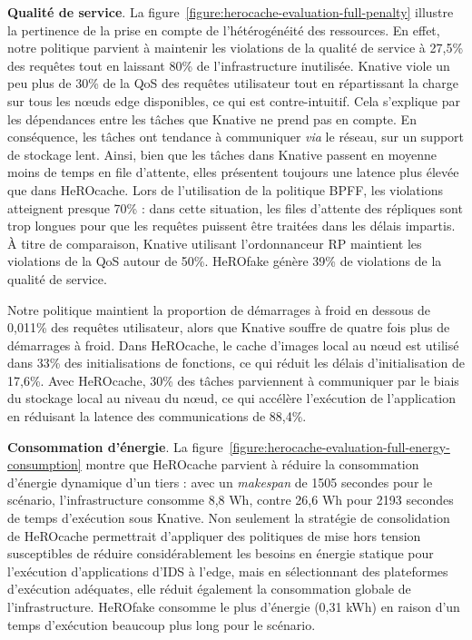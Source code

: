 {\textbf{Qualité de service}. La figure~\ref{figure:herocache-evaluation-full-penalty} illustre la pertinence de la prise en compte de l'hétérogénéité des ressources. En effet, notre politique parvient à maintenir les violations de la qualité de service à 27,5\% des requêtes tout en laissant 80\% de l'infrastructure inutilisée. Knative viole un peu plus de 30\% de la QoS des requêtes utilisateur tout en répartissant la charge sur tous les nœuds edge disponibles, ce qui est contre-intuitif. Cela s'explique par les dépendances entre les tâches que Knative ne prend pas en compte. En conséquence, les tâches ont tendance à communiquer \textit{via} le réseau, sur un support de stockage lent. Ainsi, bien que les tâches dans Knative passent en moyenne moins de temps en file d'attente, elles présentent toujours une latence plus élevée que dans HeROcache. Lors de l'utilisation de la politique BPFF, les violations atteignent presque 70\% : dans cette situation, les files d'attente des répliques sont trop longues pour que les requêtes puissent être traitées dans les délais impartis. À titre de comparaison, Knative utilisant l'ordonnanceur RP maintient les violations de la QoS autour de 50\%. HeROfake génère 39\% de violations de la qualité de service.

Notre politique maintient la proportion de démarrages à froid en dessous de 0,011\% des requêtes utilisateur, alors que Knative souffre de quatre fois plus de démarrages à froid. Dans HeROcache, le cache d'images local au nœud est utilisé dans 33\% des initialisations de fonctions, ce qui réduit les délais d'initialisation de 17,6\%.
Avec HeROcache, 30\% des tâches parviennent à communiquer par le biais du stockage local au niveau du nœud, ce qui accélère l'exécution de l'application en réduisant la latence des communications de 88,4\%.

\textbf{Consommation d'énergie}. La figure~\ref{figure:herocache-evaluation-full-energy-consumption} montre que HeROcache parvient à réduire la consommation d'énergie dynamique d'un tiers : avec un \textit{makespan} de 1505 secondes pour le scénario, l'infrastructure consomme 8,8 Wh, contre 26,6 Wh pour 2193 secondes de temps d'exécution sous Knative. Non seulement la stratégie de consolidation de HeROcache permettrait d'appliquer des politiques de mise hors tension susceptibles de réduire considérablement les besoins en énergie statique pour l'exécution d'applications d'IDS à l'edge, mais en sélectionnant des plateformes d'exécution adéquates, elle réduit également la consommation globale de l'infrastructure. HeROfake consomme le plus d'énergie (0,31 kWh) en raison d'un temps d'exécution beaucoup plus long pour le scénario.

}
